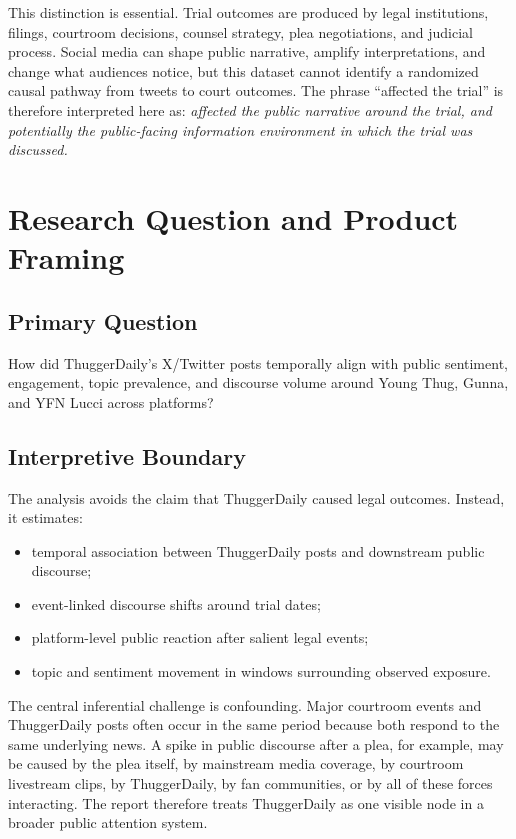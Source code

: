 \documentclass[12pt]{article}
\begin{document}
This distinction is essential. Trial outcomes are produced by legal institutions, filings, courtroom decisions, counsel strategy, plea negotiations, and judicial process. Social media can shape public narrative, amplify interpretations, and change what audiences notice, but this dataset cannot identify a randomized causal pathway from tweets to court outcomes. The phrase ``affected the trial'' is therefore interpreted here as: \emph{affected the public narrative around the trial, and potentially the public-facing information environment in which the trial was discussed.}

\section{Research Question and Product Framing}
\subsection{Primary Question}
How did ThuggerDaily's X/Twitter posts temporally align with public sentiment, engagement, topic prevalence, and discourse volume around Young Thug, Gunna, and YFN Lucci across platforms?

\subsection{Interpretive Boundary}
The analysis avoids the claim that ThuggerDaily caused legal outcomes. Instead, it estimates:
\begin{itemize}[leftmargin=*]
\item temporal association between ThuggerDaily posts and downstream public discourse;
\item event-linked discourse shifts around trial dates;
\item platform-level public reaction after salient legal events;
\item topic and sentiment movement in windows surrounding observed exposure.
\end{itemize}

The central inferential challenge is confounding. Major courtroom events and ThuggerDaily posts often occur in the same period because both respond to the same underlying news. A spike in public discourse after a plea, for example, may be caused by the plea itself, by mainstream media coverage, by courtroom livestream clips, by ThuggerDaily, by fan communities, or by all of these forces interacting. The report therefore treats ThuggerDaily as one visible node in a broader public attention system.
\end{document}

